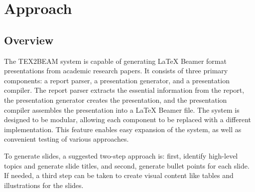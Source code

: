 \chapter{Approach}
\label{ch:approach}


\section{Overview}

The TEX2BEAM system is capable of generating LaTeX Beamer format presentations from academic research papers. It consists of three primary components: a report parser, a presentation generator, and a presentation compiler. The report parser extracts the essential information from the report, the presentation generator creates the presentation, and the presentation compiler assembles the presentation into a LaTeX Beamer file. The system is designed to be modular, allowing each component to be replaced with a different implementation. This feature enables easy expansion of the system, as well as convenient testing of various approaches.

To generate slides, a suggested two-step approach is: first, identify high-level topics and generate slide titles, and second, generate bullet points for each slide. If needed, a third step can be taken to create visual content like tables and illustrations for the slides.


